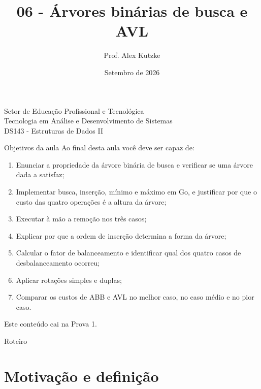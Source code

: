 \documentclass{beamer}
\title{06 - Árvores binárias de busca e AVL}
\author{Prof. Alex Kutzke}
\date{Setembro de 2026}
\begin{document}
\begin{frame}
  \begin{center}
    \large{Setor de Educação Profissional e Tecnológica}\\
    Tecnologia em Análise e Desenvolvimento de Sistemas\\
    \vspace{1cm}
    \small{DS143 - Estruturas de Dados II}
  \end{center}
  \titlepage
\end{frame}

\begin{frame}{Objetivos da aula}
  Ao final desta aula você deve ser capaz de:
  \begin{enumerate}
    \item Enunciar a propriedade da árvore binária de busca e verificar se uma
          árvore dada a satisfaz;
    \item Implementar busca, inserção, mínimo e máximo em Go, e justificar por
          que o custo das quatro operações é a altura da árvore;
    \item Executar à mão a remoção nos três casos;
    \item Explicar por que a ordem de inserção determina a forma da árvore;
    \item Calcular o fator de balanceamento e identificar qual dos quatro casos
          de desbalanceamento ocorreu;
    \item Aplicar rotações simples e duplas;
    \item Comparar os custos de ABB e AVL no melhor caso, no caso médio e no
          pior caso.
  \end{enumerate}

  \vspace{0.3cm}
  \footnotesize Este conteúdo cai na Prova 1.
\end{frame}

\begin{frame}{Roteiro}
  \tableofcontents
\end{frame}

\section{Motivação e definição}
\end{document}
